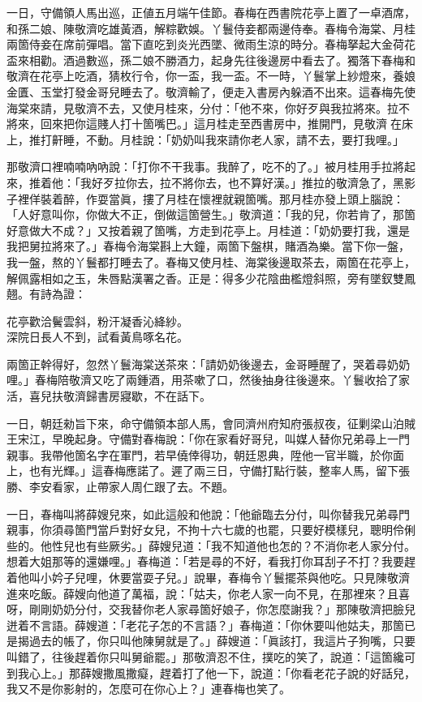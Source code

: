 一日，守備領人馬出巡，正値五月端午佳節。春梅在西書院花亭上置了一卓酒席，和孫二娘、陳敬濟吃雄黃酒，解粽歡娛。{}丫鬟侍妾都兩邊侍奉。春梅令海棠、月桂兩箇侍妾在席前彈唱。當下直吃到炎光西墜、微雨生涼的時分。春梅拏起大金荷花盃來相勸。酒過數巡，孫二娘不勝酒力，起身先往後邊房中看去了。獨落下春梅和敬濟在花亭上吃酒，猜枚行令，你一盃，我一盃。不一時，丫鬟掌上紗燈來，養娘金匱、玉堂打發金哥兒睡去了。敬濟輸了，便走入書房內躲酒不出來。這春梅先使海棠來請，見敬濟不去，又使月桂來，分付：「他不來，你好歹與我拉將來。拉不將來，回來把你這賤人打十箇嘴巴。」這月桂走至西書房中，推開門，見敬濟𢱉在床上，推打鼾睡，不動。月桂說：「奶奶叫我來請你老人家，請不去，要打我哩。」

那敬濟口裡喃喃吶吶說：「打你不干我事。{}我醉了，吃不的了。」被月桂用手拉將起來，推着他：「我好歹拉你去，拉不將你去，也不算好漢。」推拉的敬濟急了，黑影子裡佯裝着醉，作耍當眞，摟了月桂在懷裡就親箇嘴。那月桂亦發上頭上腦說：「人好意叫你，你做大不正，倒做這箇營生。」敬濟道：「我的兒，你若肯了，那箇好意做大不成？」又按着親了箇嘴，方走到花亭上。月桂道：「奶奶要打我，還是我把舅拉將來了。」春梅令海棠斟上大鐘，兩箇下盤棋，賭酒為樂。當下你一盤，我一盤，熬的丫鬟都打睡去了。春梅又使月桂、海棠後邊取茶去，兩箇在花亭上，解佩露相如之玉，朱唇點漢署之香。正是：得多少花陰曲檻燈斜照，旁有墜釵雙鳳翹。有詩為證：

\begin{myquote}
花亭歡洽鬢雲斜，粉汗凝香沁絳紗。\\深院日長人不到，試看黃鳥啄名花。
\end{myquote}

兩箇正幹得好，忽然丫鬟海棠送茶來：「請奶奶後邊去，金哥睡醒了，哭着尋奶奶哩。」春梅陪敬濟又吃了兩鍾酒，用茶嗽了口，然後抽身往後邊來。丫鬟收拾了家活，喜兒扶敬濟歸書房寢歇，不在話下。

一日，朝廷勑旨下來，命守備領本部人馬，會同濟州府知府張叔夜，征剿梁山泊賊王宋江，早晚起身。守備對春梅說：「你在家看好哥兒，叫媒人替你兄弟尋上一門親事。我帶他箇名字在軍門，若早僥倖得功，朝廷恩典，陞他一官半職，於你面上，也有光輝。」{}這春梅應諾了。遲了兩三日，守備打點行裝，整率人馬，留下張勝、李安看家，止帶家人周仁跟了去。不題。

一日，春梅叫將薛嫂兒來，如此這般和他說：「他爺臨去分付，叫你替我兄弟尋門親事，你須尋箇門當戶對好女兒，不拘十六七歲的也罷，只要好模樣兒，聰明伶俐些的。他性兒也有些厥劣。」薛嫂兒道：「我不知道他也怎的？不消你老人家分付。想着大姐那等的還嫌哩。」春梅道：「若是尋的不好，看我打你耳刮子不打？我要趕着他叫小妗子兒哩，休要當耍子兒。」說畢，春梅令丫鬟擺茶與他吃。只見陳敬濟進來吃飯。薛嫂向他道了萬福，說：「姑夫，你老人家一向不見，在那裡來？且喜呀，剛剛奶奶分付，交我替你老人家尋箇好娘子，你怎麼謝我？」那陳敬濟把臉兒迸着不言語。{}薛嫂道：「老花子怎的不言語？」春梅道：「你休要叫他姑夫，那箇已是揭過去的帳了，你只叫他陳舅就是了。」薛嫂道：「眞該打，我這片子狗嘴，只要叫錯了，往後趕着你只叫舅爺罷。」那敬濟忍不住，撲吃的笑了，說道：「這箇纔可到我心上。」{}那薛嫂撒風撒癡，趕着打了他一下，說道：「你看老花子說的好話兒，我又不是你影射的，怎麼可在你心上？」連春梅也笑了。

